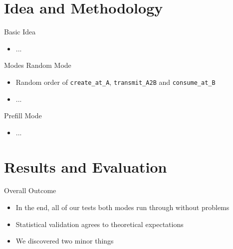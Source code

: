 \documentclass[t]{beamer} %
\begin{document}
\section{Idea and Methodology}
\begin{frame}{Basic Idea}
  \begin{itemize}
    \item ...
  \end{itemize}
    \begin{figure}[htb]
      \centering
    \end{figure}
\end{frame}

\begin{frame}{Modes}
  Random Mode
  \begin{itemize}
    \item Random order of \texttt{create\_at\_A}, \texttt{transmit\_A2B} and \texttt{consume\_at\_B}
    \item ...
  \end{itemize}
  Prefill Mode
  \begin{itemize}
    \item ...
  \end{itemize}
\end{frame}

\section{Results and Evaluation}

\begin{frame}{Overall Outcome}
  \begin{itemize}
    \item In the end, all of our tests both modes run through without problems
    \item Statistical validation agrees to theoretical expectations
    \item We discovered two minor things
  \end{itemize}
\end{frame}
\end{document}
